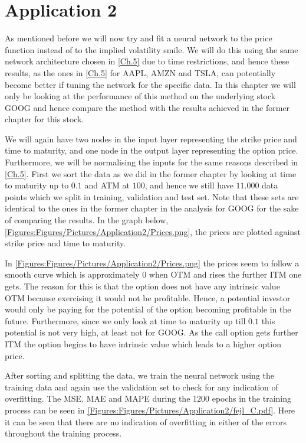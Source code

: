 \chapter{Application 2}\label{Ch:app2}
As mentioned before we will now try and fit a neural network to the price function instead of to the implied volatility smile. We will do this using the same network architecture chosen in \autoref{Ch.5} due to time restrictions, and hence these results, as the ones in \autoref{Ch.5} for AAPL, AMZN and TSLA, can potentially become better if tuning the network for the specific data. In this chapter we will only be looking at the performance of this method on the underlying stock GOOG and hence compare the method with the results achieved in the former chapter for this stock. 

We will again have two nodes in the input layer representing the strike price and time to maturity, and one node in the output layer representing the option price. Furthermore, we will be normalising the inputs for the same reasons described in \autoref{Ch.5}. First we sort the data as we did in the former chapter by looking at time to maturity up to $0.1$ and ATM at $100$, and hence we still have $11.000$ data points which we split in training, validation and test set. Note that these sets are identical to the ones in the former chapter in the analysis for GOOG for the sake of comparing the results. In the graph below, \autoref{Figures:Figures/Pictures/Application2/Prices.png}, the prices are plotted against strike price and time to maturity.


In \autoref{Figures:Figures/Pictures/Application2/Prices.png} the prices seem to follow a smooth curve which is approximately $0$ when OTM and rises the further ITM one gets. The reason for this is that the option does not have any intrinsic value OTM because exercising it would not be profitable. Hence, a potential investor would only be paying for the potential of the option becoming profitable in the future. Furthermore, since we only look at time to maturity up till $0.1$ this potential is not very high, at least not for GOOG. As the call option gets further ITM the option begins to have intrinsic value which leads to a higher option price.

After sorting and splitting the data, we train the neural network using the training data and again use the validation set to check for any indication of overfitting. The MSE, MAE and MAPE during the $1200$ epochs in the training process can be seen in \autoref{Figures:Figures/Pictures/Application2/fejl_C.pdf}. Here it can be seen that there are no indication of overfitting in either of the errors throughout the training process. 

